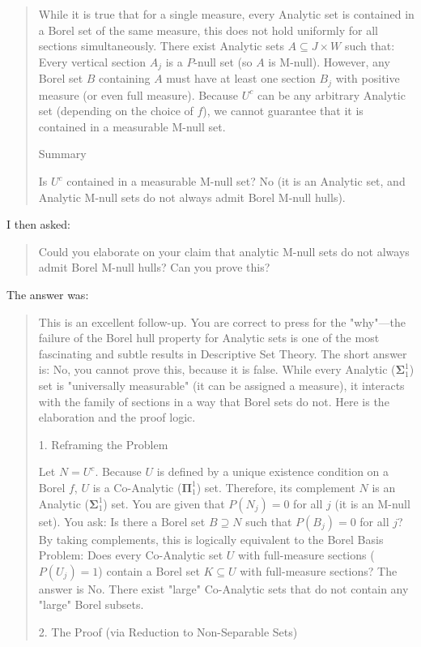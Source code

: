 \begin{Rem}
{\begin{quote}
While it is true that for a single measure, every Analytic set is contained in a Borel set of the same measure, this does not hold uniformly for all sections simultaneously.
There exist Analytic sets $A \subseteq J \times W$ such that:
Every vertical section $A_j$ is a $P$-null set (so $A$ is M-null).
However, any Borel set $B$ containing $A$ must have at least one section $B_j$ with positive measure (or even full measure).
Because $U^c$ can be any arbitrary Analytic set (depending on the choice of $f$), we cannot guarantee that it is contained in a measurable M-null set.

Summary

Is $U^c$ contained in a measurable M-null set? No (it is an Analytic set, and Analytic M-null sets do not always admit Borel M-null hulls).
    \end{quote}
    I then asked:
    \begin{quote}
      Could you elaborate on your claim that analytic M-null sets do not always admit Borel M-null hulls? Can you prove this?
    \end{quote}
    The answer was:
    \begin{quote}
This is an excellent follow-up. You are correct to press for the "why"---the failure of the Borel hull property for Analytic sets is one of the most fascinating and subtle results in Descriptive Set Theory.
The short answer is: No, you cannot prove this, because it is false. While every Analytic ($\mathbf{\Sigma}^1_1$) set is "universally measurable" (it can be assigned a measure), it interacts with the family of sections in a way that Borel sets do not.
Here is the elaboration and the proof logic.

1. Reframing the Problem

Let $N = U^c$.
Because $U$ is defined by a unique existence condition on a Borel $f$, $U$ is a Co-Analytic ($\mathbf{\Pi}^1_1$) set.
Therefore, its complement $N$ is an Analytic ($\mathbf{\Sigma}^1_1$) set.
You are given that $P(N_j) = 0$ for all $j$ (it is an M-null set).
You ask: Is there a Borel set $B \supseteq N$ such that $P(B_j) = 0$ for all $j$?
By taking complements, this is logically equivalent to the Borel Basis Problem:
Does every Co-Analytic set $U$ with full-measure sections ($P(U_j)=1$) contain a Borel set $K \subseteq U$ with full-measure sections?
The answer is No. There exist "large" Co-Analytic sets that do not contain any "large" Borel subsets.

2. The Proof (via Reduction to Non-Separable Sets)


\end{quote}}
\end{Rem}
